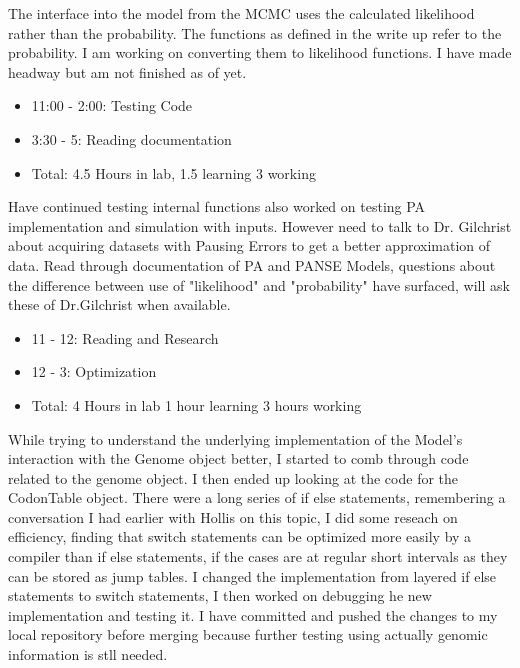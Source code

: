 \documentclass[12pt,hyperref]{labbook}
\begin{document}
The interface into the model from the MCMC uses the calculated likelihood rather than the probability. The functions as defined in the write up refer to the probability. I am working on converting them to likelihood functions. I have made headway but am not finished as of yet.
\begin{itemize}
    \item 11:00 - 2:00: Testing Code
    \item 3:30 - 5: Reading documentation
    \item Total: 4.5 Hours in lab, 1.5 learning 3 working
\end{itemize}
Have continued testing internal functions also worked on testing PA implementation and simulation with inputs. However need to talk to Dr. Gilchrist about acquiring datasets with Pausing Errors to get a better approximation of data.
Read through documentation of PA and PANSE Models, questions about the difference between use of "likelihood" and "probability" have surfaced, will ask these of Dr.Gilchrist when available.
\begin{itemize}
    \item 11 - 12: Reading and Research
    \item 12 - 3: Optimization
    \item Total: 4 Hours in lab 1 hour learning 3 hours working
\end{itemize}
While trying to understand the underlying implementation of the Model's interaction with the Genome object better, I started 
to comb through code related to the genome object. I then ended up looking at the code for the CodonTable object. There were 
a long series of if else statements, remembering a conversation I had earlier with Hollis on this topic, I did some reseach 
on efficiency, finding that switch statements can be optimized more easily by a compiler than if else statements, if the
cases are at regular short intervals as they can be stored as jump tables.
I changed the implementation from layered if else statements to switch statements, I then worked on debugging he new 
implementation and testing it. I have committed and pushed the changes to my local repository before merging because 
further testing using actually genomic information is stll needed.
\end{document}
